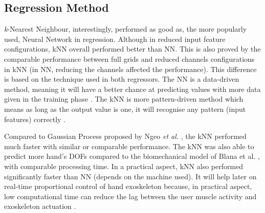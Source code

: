 \documentclass[conference]{IEEEtran}
\begin{document}
\subsection{Regression Method}
\textit{k}-Nearest Neighbour, interestingly, performed as good as, the more popularly used, Neural Network in 
regression. Although in reduced input feature configurations, kNN overall performed better than NN. This
is also proved by the comparable performance between full grids and reduced channels configurations in 
kNN (in NN, reducing the channels affected the performance). This difference is based on the technique used in both regressors. The NN is a data-driven method, meaning it will have a better chance at predicting 
values with more data given in the training phase \cite{b16}. The kNN is more pattern-driven method which means 
as long as the output value is one, it will recognise any pattern (input features) correctly \cite{b35}.

Compared to Gaussian Process proposed by Ngeo \textit{et al.} \cite{b16}, the kNN performed much faster with 
similar or comparable performance. The kNN was also able to predict more hand’s DOFs compared to the 
biomechanical model of Blana et al. \cite{b20}, with comparable processing time. In a practical aspect, kNN also 
performed significantly faster than NN (depends on the machine used). It will help later on real-time 
proportional control of hand exoskeleton because, in practical aspect, low computational time can reduce the 
lag between the user muscle activity and exoskeleton actuation \cite{b20}.
\end{document}
